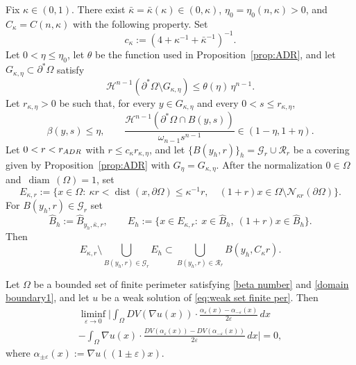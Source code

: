 \documentclass[10pt,a4paper]{amsart}
\def\diam{{\mathop\mathrm{\,diam\,}}}
\def\dist{{\mathop\mathrm{dist}}}
\begin{document}
\begin{lem}\label{lem:flat-cover}
Fix $\kappa\in(0,1)$. There exist $\bar\kappa=\bar\kappa(\kappa)\in(0,\kappa)$, $\eta_0=\eta_0(n,\kappa)>0$, and
$C_\kappa=C(n,\kappa)$ with the following property. Set
\[
c_\kappa:=(4+\kappa^{-1}+\bar\kappa^{-1})^{-1}.
\]
Let $0<\eta\le\eta_0$, let $\theta$ be the function used in Proposition~\ref{prop:ADR}, and let
$G_{\kappa,\eta}\subset\partial^*\Omega$ satisfy
\[
\mathscr H^{n-1}(\partial^*\Omega\setminus G_{\kappa,\eta})\le \theta(\eta)\,\eta^{n-1}.
\]
Let $r_{\kappa,\eta}>0$ be such that, for every
$y\in G_{\kappa,\eta}$ and every $0<s\le r_{\kappa,\eta}$,
\[
\beta(y,s)\le\eta,\qquad 
\frac{\mathscr H^{n-1}(\partial^*\Omega\cap B(y,s))}{\omega_{n-1}s^{n-1}}\in(1-\eta,1+\eta).
\]
Let $0<r<r_{\rm ADR}$ with $r\le c_\kappa r_{\kappa,\eta}$, and let
$\{B(y_h,r)\}_h=\mathcal G_r\cup\mathcal R_r$ be a covering given by Proposition~\ref{prop:ADR} with 
$G_\eta=G_{\kappa,\eta}$.
After the normalization $0\in\Omega$ and $\diam(\Omega)=1$, set
\[
E_{\kappa,r}:=\{x\in\Omega:\ \kappa r<\dist(x,\partial\Omega)\le \kappa^{-1}r,\quad
(1+r)x\in\Omega\setminus\mathcal N_{\kappa r}(\partial\Omega)\}.
\]
For $B(y_h,r)\in\mathcal G_r$ set
\[
\widehat B_h:=\widehat B_{y_h,\bar\kappa,r},\qquad
E_h:=\{x\in E_{\kappa,r}:\ x\in \widehat B_h,\ (1+r)x\in \widehat B_h\}.
\]
Then
\[
E_{\kappa,r}\setminus\bigcup_{B(y_h,r)\in\mathcal G_r}E_h
\subset
\bigcup_{B(y_h,r)\in\mathcal R_r} B(y_h,C_\kappa r).
\]
\end{lem}

\begin{lem}\label{second derivative}
Let $\Omega$ be a bounded set of finite perimeter satisfying \eqref{beta number} and \eqref{domain boundary1}, and let
$u$ be a weak solution of \eqref{eq:weak set finite per}. Then
\begin{multline}\label{change derivative}
\liminf_{\varepsilon\to 0}\bigg|
\int_{\Omega} DV(\nabla u(x))\cdot \frac{\alpha_{\varepsilon}(x)-\alpha_{-\varepsilon}(x)}{2\varepsilon}\,dx \\
-
\int_{\Omega} \nabla u(x)\cdot \frac{DV(\alpha_{\varepsilon}(x))-DV(\alpha_{-\varepsilon}(x))}{2\varepsilon}\,dx
\bigg|=0,
\end{multline}
where $\alpha_{\pm\varepsilon}(x):=\nabla u((1\pm\varepsilon)x)$.
\end{lem}
\end{document}
